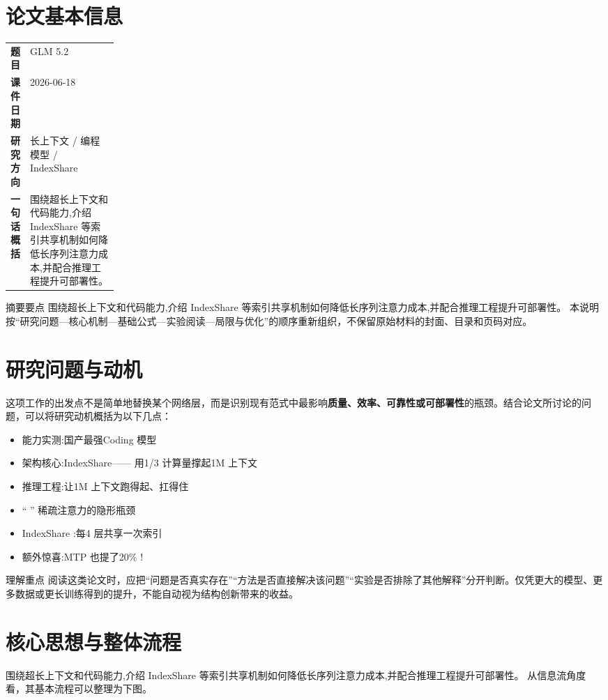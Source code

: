 \documentclass[UTF8,11pt,a4paper]{ctexart}
\newcommand{\term}[1]{\textbf{\textcolor{mainblue}{#1}}}
\begin{document}
\section{论文基本信息}
\begin{center}
\begin{tabularx}{0.94\linewidth}{>{\bfseries}p{0.18\linewidth}X}
\toprule
题目 & GLM 5.2\\
课件日期 & 2026-06-18\\
研究方向 & 长上下文 / 编程模型 / IndexShare\\
一句话概括 & 围绕超长上下文和代码能力,介绍 IndexShare 等索引共享机制如何降低长序列注意力成本,并配合推理工程提升可部署性。\\
\bottomrule
\end{tabularx}
\end{center}

\begin{infobox}{摘要要点}
围绕超长上下文和代码能力,介绍 IndexShare 等索引共享机制如何降低长序列注意力成本,并配合推理工程提升可部署性。 本说明按“研究问题—核心机制—基础公式—实验阅读—局限与优化”的顺序重新组织，不保留原始材料的封面、目录和页码对应。
\end{infobox}

\section{研究问题与动机}
这项工作的出发点不是简单地替换某个网络层，而是识别现有范式中最影响\term{质量、效率、可靠性或可部署性}的瓶颈。结合论文所讨论的问题，可以将研究动机概括为以下几点：
\begin{itemize}
\item 能力实测:国产最强Coding 模型
\item 架构核心:IndexShare—— 用1/3 计算量撑起1M 上下文
\item 推理工程:让1M 上下文跑得起、扛得住
\item “ ” 稀疏注意力的隐形瓶颈
\item IndexShare :每4 层共享一次索引
\item 额外惊喜:MTP 也提了20\% !
\end{itemize}

\begin{notebox}{理解重点}
阅读这类论文时，应把“问题是否真实存在”“方法是否直接解决该问题”“实验是否排除了其他解释”分开判断。仅凭更大的模型、更多数据或更长训练得到的提升，不能自动视为结构创新带来的收益。
\end{notebox}

\section{核心思想与整体流程}
围绕超长上下文和代码能力,介绍 IndexShare 等索引共享机制如何降低长序列注意力成本,并配合推理工程提升可部署性。 从信息流角度看，其基本流程可以整理为下图。
\end{document}
